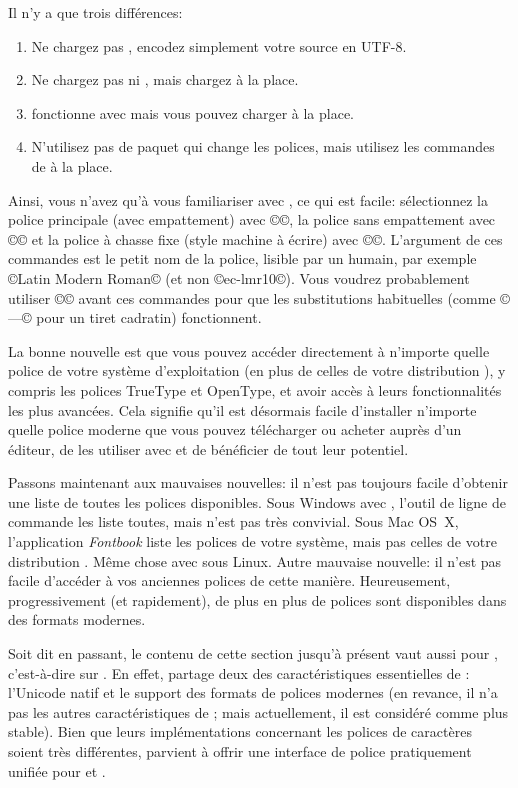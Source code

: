 \documentclass{lltxdoc}
\begin{document}
Il n'y a que trois différences:
\begin{enumerate}
  \item Ne chargez pas , encodez simplement votre source en UTF-8.
  \item Ne chargez pas  ni , mais chargez 
     à la place.
  \item {} fonctionne avec \lualatex{} mais vous pouvez charger 
     à la place.
  \item N'utilisez pas de paquet qui change les polices, mais utilisez les commandes
    de  à la place.
\end{enumerate}
Ainsi, vous n'avez qu'à vous familiariser avec , ce qui est facile:
sélectionnez la police principale (avec empattement) avec ©\setmainfont©,
la police sans empattement avec ©\setsansfont© et la police à chasse fixe
(style machine à écrire) avec ©\setmonofont©. L'argument de ces commandes est
le petit nom de la police, lisible par un humain, par exemple ©Latin Modern Roman©
(et non ©ec-lmr10©). Vous voudrez probablement utiliser ©©
avant ces commandes pour que les substitutions \tex habituelles
(comme ©---© pour un tiret cadratin) fonctionnent.

La bonne nouvelle est que vous pouvez accéder directement à n'importe quelle
police de votre système d'exploitation (en plus de celles de votre distribution \tex),
y compris les polices TrueType et OpenType, et avoir accès à leurs fonctionnalités
les plus avancées. Cela signifie qu'il est désormais facile d'installer n'importe
quelle police moderne que vous pouvez télécharger ou acheter auprès d'un éditeur,
de les utiliser avec \lualatex{} et de bénéficier de tout leur potentiel.

Passons maintenant aux mauvaises nouvelles: il n'est pas toujours facile d'obtenir
une liste de toutes les polices disponibles. Sous Windows avec \texlive, l'outil
de ligne de commande  les liste toutes, mais n'est pas très convivial.
Sous Mac OS~X, l'application \emph{Fontbook} liste les polices de votre système,
mais pas celles de votre distribution \tex. Même chose avec  sous Linux.
Autre mauvaise nouvelle: il n'est pas facile d'accéder à vos anciennes polices
de cette manière. Heureusement, progressivement (et rapidement), de plus en plus
de polices sont disponibles dans des formats modernes.

Soit dit en passant, le contenu de cette section jusqu'à présent vaut aussi pour
\xelatex, c'est-à-dire \latex sur \xetex. En effet, \xetex partage deux des
caractéristiques essentielles de \luatex: l'Unicode natif et le support des formats
de polices modernes (en revance, il n'a pas les autres caractéristiques de \luatex;
mais actuellement, il est considéré comme plus stable). Bien que leurs implémentations
concernant les polices de caractères soient très différentes,  parvient
à offrir une interface de police pratiquement unifiée pour \xelatex et \lualatex.
\end{document}
